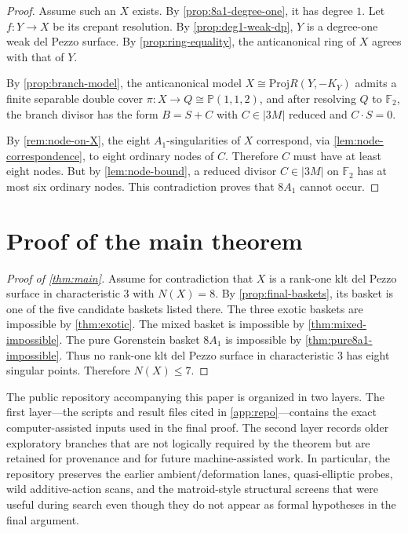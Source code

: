\documentclass[11pt]{article}
\theoremstyle{definition}
\newcommand{\Pbb}{\mathbb P}
\newcommand{\Proj}{\mathrm{Proj}}
\begin{document}
\begin{proof}
Assume such an $X$ exists. By \cref{prop:8a1-degree-one}, it has degree $1$. Let $f\colon Y\to X$ be its crepant resolution. By \cref{prop:deg1-weak-dp}, $Y$ is a degree-one weak del Pezzo surface. By \cref{prop:ring-equality}, the anticanonical ring of $X$ agrees with that of $Y$.

By \cref{prop:branch-model}, the anticanonical model $X\cong\Proj R(Y,-K_Y)$ admits a finite separable double cover $\pi\colon X\to Q\cong \Pbb(1,1,2)$, and after resolving $Q$ to $\mathbb F_2$, the branch divisor has the form $B=S+C$ with $C\in |3M|$ reduced and $C\cdot S=0$.

By \cref{rem:node-on-X}, the eight $A_1$-singularities of $X$ correspond, via \cref{lem:node-correspondence}, to eight ordinary nodes of $C$. Therefore $C$ must have at least eight nodes. But by \cref{lem:node-bound}, a reduced divisor $C\in |3M|$ on $\mathbb F_2$ has at most six ordinary nodes. This contradiction proves that $8A_1$ cannot occur.
\end{proof}

\section{Proof of the main theorem}

\begin{proof}[Proof of \cref{thm:main}]
Assume for contradiction that $X$ is a rank-one klt del Pezzo surface in characteristic $3$ with $N(X)=8$. By \cref{prop:final-baskets}, its basket is one of the five candidate baskets listed there. The three exotic baskets are impossible by \cref{thm:exotic}. The mixed basket is impossible by \cref{thm:mixed-impossible}. The pure Gorenstein basket $8A_1$ is impossible by \cref{thm:pure8a1-impossible}. Thus no rank-one klt del Pezzo surface in characteristic $3$ has eight singular points. Therefore $N(X)\le 7$.
\end{proof}

The public repository accompanying this paper is organized in two layers. The first layer---the scripts and result files cited in \cref{app:repo}---contains the exact computer-assisted inputs used in the final proof. The second layer records older exploratory branches that are not logically required by the theorem but are retained for provenance and for future machine-assisted work. In particular, the repository preserves the earlier ambient/deformation lanes, quasi-elliptic probes, wild additive-action scans, and the matroid-style structural screens that were useful during search even though they do not appear as formal hypotheses in the final argument.
\end{document}
